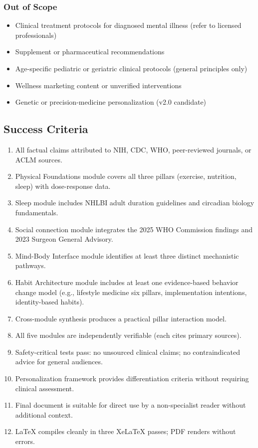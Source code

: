 \documentclass[11pt,letterpaper]{article}
\begin{document}
\subsubsection{Out of Scope}
\begin{itemize}[leftmargin=1.5em]
  \item Clinical treatment protocols for diagnosed mental illness (refer to licensed professionals)
  \item Supplement or pharmaceutical recommendations
  \item Age-specific pediatric or geriatric clinical protocols (general principles only)
  \item Wellness marketing content or unverified interventions
  \item Genetic or precision-medicine personalization (v2.0 candidate)
\end{itemize}

\subsection{Success Criteria}

\begin{enumerate}[leftmargin=1.5em]
  \item All factual claims attributed to NIH, CDC, WHO, peer-reviewed journals, or ACLM sources.
  \item Physical Foundations module covers all three pillars (exercise, nutrition, sleep) with dose-response data.
  \item Sleep module includes NHLBI adult duration guidelines and circadian biology fundamentals.
  \item Social connection module integrates the 2025 WHO Commission findings and 2023 Surgeon General Advisory.
  \item Mind-Body Interface module identifies at least three distinct mechanistic pathways.
  \item Habit Architecture module includes at least one evidence-based behavior change model (e.g., lifestyle medicine six pillars, implementation intentions, identity-based habits).
  \item Cross-module synthesis produces a practical pillar interaction model.
  \item All five modules are independently verifiable (each cites primary sources).
  \item Safety-critical tests pass: no unsourced clinical claims; no contraindicated advice for general audiences.
  \item Personalization framework provides differentiation criteria without requiring clinical assessment.
  \item Final document is suitable for direct use by a non-specialist reader without additional context.
  \item LaTeX compiles cleanly in three XeLaTeX passes; PDF renders without errors.
\end{enumerate}
\end{document}
